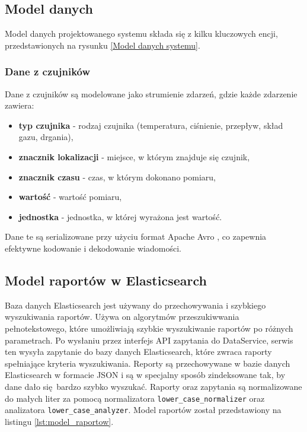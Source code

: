 \subsection{Model danych}
\label{subsec:model_danych}

Model danych projektowanego systemu składa się z kilku kluczowych encji, przedstawionych na rysunku \ref{Model danych systemu}.


\subsubsection{Dane z czujników}
\label{subsubsec:dane_czujnikow}

Dane z czujników są modelowane jako strumienie zdarzeń, gdzie każde zdarzenie zawiera:

\begin{itemize}
    \item \textbf{typ czujnika} - rodzaj czujnika (temperatura, ciśnienie, przepływ, skład gazu, drgania),
    \item \textbf{znacznik lokalizacji} - miejsce, w którym znajduje się czujnik,
    \item \textbf{znacznik czasu} - czas, w którym dokonano pomiaru,
    \item \textbf{wartość} - wartość pomiaru,
    \item \textbf{jednostka} - jednostka, w której wyrażona jest wartość.
\end{itemize}

Dane te są serializowane przy użyciu format Apache Avro \cite{avro_documentation}, co zapewnia efektywne kodowanie i dekodowanie wiadomości.

\subsection{Model raportów w Elasticsearch}
\label{subsec:model_raportow}

Baza danych Elasticsearch jest używany do przechowywania i szybkiego wyszukiwania raportów. Używa on algorytmów przeszukiwwania pełnotekstowego, które umożliwiają szybkie wyszukiwanie raportów po różnych parametrach. Po wysłaniu przez interfejs API zapytania do DataService, serwis ten wysyła zapytanie do bazy danych Elasticsearch, które zwraca raporty spełniające kryteria wyszukiwania. Reporty są przechowywane w bazie danych Elasticsearch w formacie JSON i są w specjalny sposób zindeksowane tak, by dane dało się bardzo szybko wyszukać. Raporty oraz zapytania są normalizowane do małych liter za pomocą normalizatora \texttt{lower\_case\_normalizer} oraz analizatora \texttt{lower\_case\_analyzer}. Model raportów został przedstawiony na listingu \ref{lst:model_raportow}.

